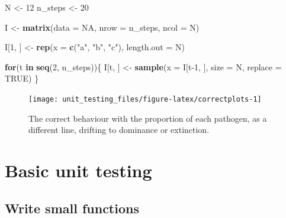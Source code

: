\documentclass[
]{article}
\newenvironment{Shaded}{\begin{snugshade}}{\end{snugshade}}
\newcommand{\ControlFlowTok}[1]{\textcolor[rgb]{0.13,0.29,0.53}{\textbf{#1}}}
\newcommand{\DataTypeTok}[1]{\textcolor[rgb]{0.13,0.29,0.53}{#1}}
\newcommand{\DecValTok}[1]{\textcolor[rgb]{0.00,0.00,0.81}{#1}}
\newcommand{\KeywordTok}[1]{\textcolor[rgb]{0.13,0.29,0.53}{\textbf{#1}}}
\newcommand{\NormalTok}[1]{#1}
\newcommand{\OtherTok}[1]{\textcolor[rgb]{0.56,0.35,0.01}{#1}}
\newcommand{\StringTok}[1]{\textcolor[rgb]{0.31,0.60,0.02}{#1}}
\begin{document}
\begin{Shaded}
\begin{Highlighting}[]
\NormalTok{N <-}\StringTok{ }\DecValTok{12}
\NormalTok{n_steps <-}\StringTok{ }\DecValTok{20}

\NormalTok{I <-}\StringTok{ }\KeywordTok{matrix}\NormalTok{(}\DataTypeTok{data =} \OtherTok{NA}\NormalTok{, }\DataTypeTok{nrow =}\NormalTok{ n_steps, }\DataTypeTok{ncol =}\NormalTok{ N)}

\NormalTok{I[}\DecValTok{1}\NormalTok{, ] <-}\StringTok{ }\KeywordTok{rep}\NormalTok{(}\DataTypeTok{x =} \KeywordTok{c}\NormalTok{(}\StringTok{"a"}\NormalTok{, }\StringTok{"b"}\NormalTok{, }\StringTok{"c"}\NormalTok{), }\DataTypeTok{length.out =}\NormalTok{ N)}

\ControlFlowTok{for}\NormalTok{(t }\ControlFlowTok{in} \KeywordTok{seq}\NormalTok{(}\DecValTok{2}\NormalTok{, n_steps))\{}
\NormalTok{  I[t, ] <-}\StringTok{ }\KeywordTok{sample}\NormalTok{(}\DataTypeTok{x =}\NormalTok{ I[t}\DecValTok{-1}\NormalTok{, ], }\DataTypeTok{size =}\NormalTok{ N, }\DataTypeTok{replace =} \OtherTok{TRUE}\NormalTok{)}
\NormalTok{\}}
\end{Highlighting}
\end{Shaded}

\begin{figure}[h]

{\centering \texttt{[image: unit\_testing\_files/figure-latex/correctplots-1]} 

}

\caption{The correct behaviour with the proportion of each pathogen, as a different line, drifting to dominance or extinction.}\label{fig:correctplots}
\end{figure}

\hypertarget{basic-unit-testing}{%
\section{Basic unit testing}\label{basic-unit-testing}}

\hypertarget{compactfuns}{%
\subsection*{Write small functions}\label{compactfuns}}
\end{document}
